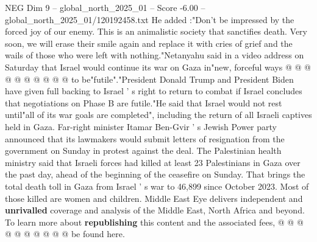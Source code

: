 \begin{textsample}{NEG Dim 9 – global\_north\_2025\_01 – Score -6.00 – global\_north\_2025\_01/120192458.txt}
He added :"Don't be impressed by the forced joy of our enemy.
This is an animalistic society that sanctifies death.
Very soon, we will erase their smile again and replace it with cries of grief and the wails of those who were left with nothing."Netanyahu said in a video address on Saturday that Israel would continue its war on Gaza in"new, forceful ways @ @ @ @ @ @ @ @ @ @ to be"futile"."President Donald Trump and President Biden have given full backing to Israel ' s right to return to combat if Israel concludes that negotiations on Phase B are futile."He said that Israel would not rest until"all of its war goals are completed", including the return of all Israeli captives held in Gaza.
Far-right minister Itamar Ben-Gvir ' s Jewish Power party announced that its lawmakers would submit letters of resignation from the government on Sunday in protest against the deal.
The Palestinian health ministry said that Israeli forces had killed at least 23 Palestinians in Gaza over the past day, ahead of the beginning of the ceasefire on Sunday.
That brings the total death toll in Gaza from Israel ' s war to 46,899 since October 2023.
Most of those killed are women and children.
Middle East Eye delivers independent and \textbf{unrivalled} coverage and analysis of the Middle East, North Africa and beyond.
To learn more about \textbf{republishing} this content and the associated fees, @ @ @ @ @ @ @ @ @ @ be found here.

\end{textsample}
